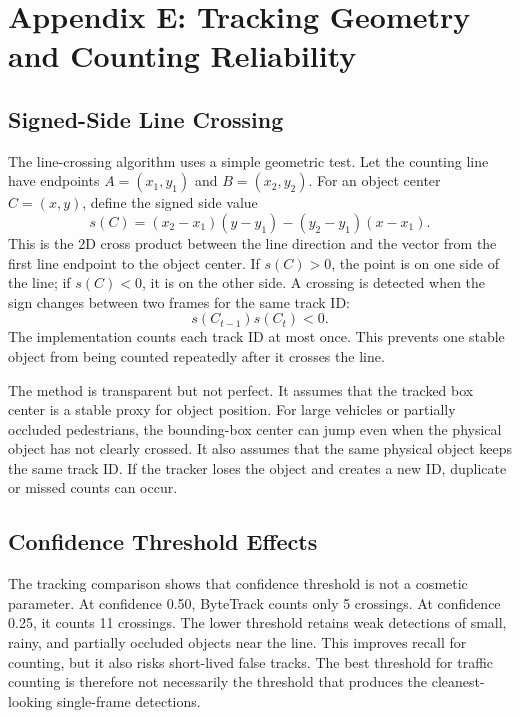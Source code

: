 \documentclass[10pt,twocolumn]{article}
\begin{document}
\section{Appendix E: Tracking Geometry and Counting Reliability}

\subsection{Signed-Side Line Crossing}

The line-crossing algorithm uses a simple geometric test. Let the counting line have endpoints $A=(x_1,y_1)$ and $B=(x_2,y_2)$. For an object center $C=(x,y)$, define the signed side value
\begin{equation}
s(C)=(x_2-x_1)(y-y_1)-(y_2-y_1)(x-x_1).
\end{equation}
This is the 2D cross product between the line direction and the vector from the first line endpoint to the object center. If $s(C)>0$, the point is on one side of the line; if $s(C)<0$, it is on the other side. A crossing is detected when the sign changes between two frames for the same track ID:
\begin{equation}
s(C_{t-1})s(C_t)<0.
\end{equation}
The implementation counts each track ID at most once. This prevents one stable object from being counted repeatedly after it crosses the line.

The method is transparent but not perfect. It assumes that the tracked box center is a stable proxy for object position. For large vehicles or partially occluded pedestrians, the bounding-box center can jump even when the physical object has not clearly crossed. It also assumes that the same physical object keeps the same track ID. If the tracker loses the object and creates a new ID, duplicate or missed counts can occur.

\subsection{Confidence Threshold Effects}

The tracking comparison shows that confidence threshold is not a cosmetic parameter. At confidence 0.50, ByteTrack counts only 5 crossings. At confidence 0.25, it counts 11 crossings. The lower threshold retains weak detections of small, rainy, and partially occluded objects near the line. This improves recall for counting, but it also risks short-lived false tracks. The best threshold for traffic counting is therefore not necessarily the threshold that produces the cleanest-looking single-frame detections.
\end{document}
